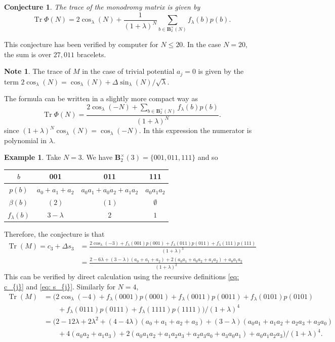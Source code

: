 \documentclass[11pt]{article}
\newtheorem{conj}{Conjecture}
\theoremstyle{definition}
\newtheorem*{note}{Note}
\newtheorem{exa}{Example}
\DeclareMathOperator*{\Tr}{\mathrm{Tr}}
\begin{document}
\begin{conj}
The trace of the monodromy matrix is given by
\begin{equation}
	\Tr \Phi(N)=2\cos_\lambda(N)+\frac1{(1+\lambda)^N}\sum_{b\in\mathbf B^\times_2(N)} f_\lambda(b) p(b).
\end{equation}
\end{conj}
This conjecture has been verified by computer for $N \le 20$. In the case $N=20$, the sum is over $27,011$ bracelets.
\begin{note}		
The trace of $M$ in the case of trivial potential $a_j=0$ is given by the term $2\cos_\lambda(N)=\cos_\lambda(N)+\Delta\sin_\lambda(N)/ \sqrt\lambda$.	
\end{note}		

The formula can be written in a slightly more compact way as 
\begin{equation}
	\Tr \Phi(N)=\frac{2\cos_\lambda(-N)+\sum_{b\in\mathbf B^\times_2(N)} f_\lambda(b) p(b)}{(1+\lambda)^N}.
\end{equation}
since $(1 + \lambda)^N\cos_\lambda(N) = \cos_\lambda(-N)$. In this expression the numerator is polynomial in $\lambda$.

\begin{exa}
Take $N = 3$. We have $\mathbf B^\times_2(3) = \{001, 011, 111\}$ and so
\begin{center}
\begin{tabular}{c|ccc}
$b$&001&011&111\\\hline	
$p(b)$&$a_0 +a_1 +a_2$ &$a_0a_1 +a_0a_2 +a_1a_2$&$a_0a_1a_2$\\
$\beta(b)$&$(2)$&$(1)$&$\emptyset$\\
$f_\lambda(b)$&$3-\lambda$&$2$&$1$
\end{tabular}
\end{center}
Therefore, the conjecture is that
\begin{align*}
\Tr(M)=c_3 +\Delta s_3 &= \frac{2\cos_\lambda(−3)+f_\lambda(001)p(001)+f_\lambda(011)p(011)+f_\lambda(111)p(111)}{(1+\lambda)^3}\\
&=\frac{2-6\lambda+(3-\lambda)(a_0 +a_1 +a_2)+2(a_0a_1 +a_0a_2 +a_1a_2)+a_0a_1a_2}{(1+\lambda)^3}	
\end{align*}
This can be verified by direct calculation using the recursive definitions \eqref{eq: c_{j}} and \eqref{eq: s_{j}}.
Similarly for $N=4$, 
\begin{align*}
\Tr(M)&=\bigl(2\cos_\lambda(−4)+f_\lambda(0001)p(0001)+f_\lambda(0011)p(0011)+f_\lambda(0101)p(0101)\\
&\qquad+f_\lambda(0111)p(0111)+f_\lambda(1111)p(1111)\bigr)/(1+\lambda)^4\\
&=\bigl(2-12\lambda+2\lambda^2+(4-4\lambda)(a_0 +a_1 +a_2+a_3)+(3-\lambda)(a_0a_1 +a_1a_2 +a_2a_3+a_3a_0)\\
&\qquad+4(a_0a_2+a_1a_3)+2(a_0a_1a_2+a_1a_2a_3+a_2a_3a_0+a_3a_0a_1)+a_0a_1a_2a_3\bigr)/(1+\lambda)^4.	
\end{align*}

\end{exa}
\end{document}
